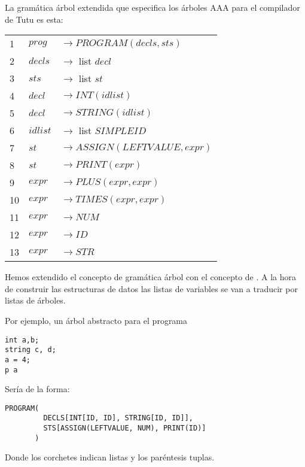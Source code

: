 \begin{definition}
\label{definition:tutuast}
La gramática árbol extendida que especifica los árboles AAA
para el compilador de Tutu es esta:

\begin{center}
\begin{tabular}{l|ll}
  1 & $prog$   &$\rightarrow PROGRAM(decls, sts)$\\
  2 & $decls$  &$\rightarrow$ list $decl$\\
  3 & $sts$    &$\rightarrow$ list $st$\\
  4 & $decl$   &$\rightarrow INT(idlist)$\\
  5 & $decl$   &$\rightarrow STRING(idlist)$\\
  6 & $idlist$ &$\rightarrow$ list $SIMPLEID$\\
  7 & $st$     &$\rightarrow ASSIGN(LEFTVALUE, expr)$\\
  8 & $st$     &$\rightarrow PRINT(expr)$\\
  9 & $expr$   &$\rightarrow PLUS(expr, expr)$\\
 10 & $expr$   &$\rightarrow TIMES(expr, expr)$\\
 11 & $expr$   &$\rightarrow NUM$\\
 12 & $expr$   &$\rightarrow ID$\\
 13 & $expr$   &$\rightarrow STR$\\
\end{tabular}
\end{center}
\end{definition}

Hemos extendido el concepto de gramática 
árbol con el concepto de . 
A la hora de construir las estructuras de datos
las listas de variables se van a traducir por listas de árboles.

Por ejemplo, un árbol abstracto para el programa

\begin{verbatim}
int a,b;
string c, d;
a = 4;
p a
\end{verbatim}

Sería de la forma:

\begin{verbatim}
PROGRAM(
         DECLS[INT[ID, ID], STRING[ID, ID]], 
         STS[ASSIGN(LEFTVALUE, NUM), PRINT(ID)]
       )
\end{verbatim}

Donde los corchetes indican listas y los paréntesis tuplas.

